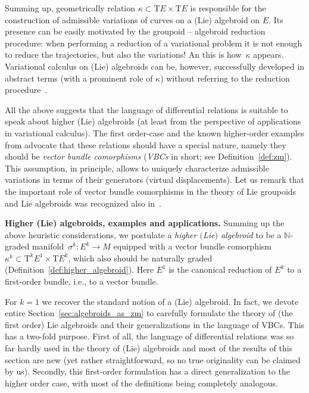 \documentclass[10pt,a4paper]{amsart}
\newcommand{\grB}{{$\N$-graded manifold}}
\newcommand{\ZM}{{VBC}} %
\newcommand{\Zakrzewski}{{vector bundle comorphism}}
\newcommand{\N}{\mathbb{N}}
\newcommand{\ra}{\rightarrow}
\newcommand{\T}{\mathrm{T}} %
\newcommand{\TT}[1]{\mathrm{T}^{#1}} %
\numberwithin{equation}{section}
\theoremstyle{definition}
\begin{document}
Summing up, geometrically relation $\kappa\subset\T E\times\T E$ is responsible for the construction of admissible variations of curves on a (Lie) algebroid on $E$. Its presence can be easily motivated by the groupoid -- algebroid reduction procedure: when performing a reduction of a variational problem it is not enough to reduce the trajectories, but also the variations! An this is how~$\kappa$ appears. Variational calculus on (Lie) algebroids can be, however, successfully developed in abstract terms (with a prominent role of $\kappa$) without referring to the reduction procedure~\cite{GG_var_calc_gen_alg_2008}.

All the above suggests that the language of differential relations is suitable to speak about higher (Lie) algebroids (at least from the perspective of applications in variational calculus). The first order-case \cite{GG_var_calc_gen_alg_2008} and the known higher-order examples from \cite{MJ_MR_prototypes} advocate that these relations should have a special nature, namely they should be \emph{\Zakrzewski s} (\emph{\ZM s} in short; see Definition~\ref{def:zm}). This assumption, in principle, allows to uniquely characterize admissible variations in terms of their generators (virtual displacements). Let us remark that the important role of \Zakrzewski s in the theory of Lie groupoids and Lie algebroids was recognized also in~\cite{Cattaneo_Dherin_Weinstein_2012}.

{\bf Higher (Lie) algebroids, examples and applications.} Summing up the above heuristic considerations, we postulate a \emph{higher $($Lie$)$ algebroid} to be a \grB\ $\sigma^k\colon E^k\ra M$ equipped with a \Zakrzewski\ $\kappa^k\subset\TT{k} E^1\times \T E^k$, which also should be naturally graded (Definition~\ref{def:higher_algebroid}). Here $E^1$ is the canonical reduction of $E^k$ to a first-order bundle, i.e., to a vector bundle.

For $k=1$ we recover the standard notion of a (Lie) algebroid. In fact, we devote entire Section~\ref{sec:algebroids_as_zm} to carefully formulate the theory of (the first order) Lie algebroids and their generalizations in the language of \ZM s. This has a two-fold purpose. First of all, the language of differential relations was so far hardly used in the theory of (Lie) algebroids and most of the results of this section are new (yet rather straightforward, so no true originality can be claimed by us). Secondly, this first-order formulation has a direct generalization to the higher order case, with most of the definitions being completely analogous.
\end{document}

